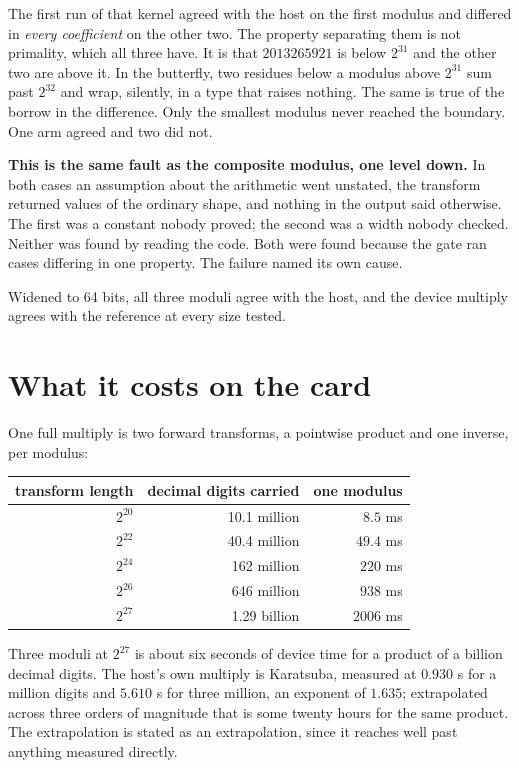 The first run of that kernel agreed with the host on the first modulus and differed in \emph{every coefficient} on the other two. The property separating them is not primality, which all three have. It is that \(2013265921\) is below \(2^{31}\) and the other two are above it. In the butterfly, two residues below a modulus above \(2^{31}\) sum past \(2^{32}\) and wrap, silently, in a type that raises nothing. The same is true of the borrow in the difference. Only the smallest modulus never reached the boundary. One arm agreed and two did not.

\textbf{This is the same fault as the composite modulus, one level down.} In both cases an assumption about the arithmetic went unstated, the transform returned values of the ordinary shape, and nothing in the output said otherwise. The first was a constant nobody proved; the second was a width nobody checked. Neither was found by reading the code. Both were found because the gate ran cases differing in one property. The failure named its own cause.

Widened to 64 bits, all three moduli agree with the host, and the device multiply agrees with the reference at every size tested.

\section{What it costs on the card}

One full multiply is two forward transforms, a pointwise product and one inverse, per modulus:

\begin{center}
\begin{tabular}{@{}rrr@{}}
\toprule
transform length & decimal digits carried & one modulus \\
\midrule
\(2^{20}\) & 10.1 million & \(8.5\) ms \\
\(2^{22}\) & 40.4 million & \(49.4\) ms \\
\(2^{24}\) & 162 million & \(220\) ms \\
\(2^{26}\) & 646 million & \(938\) ms \\
\(2^{27}\) & 1.29 billion & \(2006\) ms \\
\bottomrule
\end{tabular}
\end{center}

Three moduli at \(2^{27}\) is about six seconds of device time for a product of a billion decimal digits. The host's own multiply is Karatsuba, measured at \(0.930\) s for a million digits and \(5.610\) s for three million, an exponent of \(1.635\); extrapolated across three orders of magnitude that is some twenty hours for the same product. The extrapolation is stated as an extrapolation, since it reaches well past anything measured directly.

